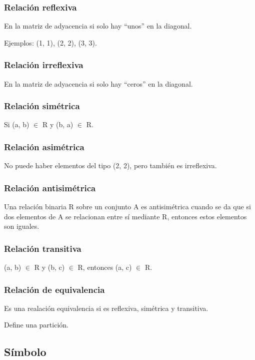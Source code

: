 \documentclass{article}
\begin{document}
\subsubsection{Relación reflexiva}

En la matriz de adyacencia si solo hay ``unos'' en la diagonal.

Ejemplos: (1, 1), (2, 2), (3, 3).

\subsubsection{Relación irreflexiva}

En la matriz de adyacencia si solo hay ``ceros'' en la diagonal.

\subsubsection{Relación simétrica}
Si (a, b) $\in$ R y (b, a) $\in$ R.

\subsubsection{Relación asimétrica}
No puede haber elementos del tipo (2, 2), pero también es irreflexiva.

\subsubsection{Relación antisimétrica}
Una relación binaria R sobre un conjunto A es antisimétrica cuando se da que
si dos elementos de A se relacionan entre sí mediante R, entonces estos elementos son iguales.

\subsubsection{Relación transitiva}
(a, b) $\in$ R y (b, c) $\in$ R, entonces (a, c) $\in$ R.

\subsubsection{Relación de equivalencia}

Es una realación equivalencia si es reflexiva, simétrica y transitiva.

Define una partición.

\subsection{Símbolo}
\end{document}
